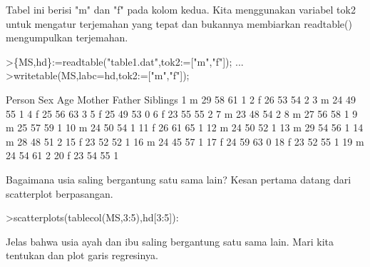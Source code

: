 \documentclass[12pt,arial,letterpaper]{book}
\begin{document}
\begin{eulernootebook}
\begin{eulercomment}
\begin{eulercomment}
\begin{eulernootebook}
\begin{eulercomment}
\begin{eulercomment}
\begin{eulercomment}
\begin{eulercomment}
\begin{eulercomment}
\begin{eulercomment}
\begin{eulercomment}
\begin{eulercomment}
Tabel ini berisi "m" dan "f" pada kolom kedua. Kita menggunakan
variabel tok2 untuk mengatur terjemahan yang tepat dan bukannya
membiarkan readtable() mengumpulkan terjemahan.
\end{eulercomment}
\begin{eulerprompt}
>\{MS,hd\}:=readtable("table1.dat",tok2:=["m","f"]);  ...
>writetable(MS,labc=hd,tok2:=["m","f"]);
\end{eulerprompt}
\begin{euleroutput}
      Person       Sex       Age    Mother    Father  Siblings
           1         m        29        58        61         1
           2         f        26        53        54         2
           3         m        24        49        55         1
           4         f        25        56        63         3
           5         f        25        49        53         0
           6         f        23        55        55         2
           7         m        23        48        54         2
           8         m        27        56        58         1
           9         m        25        57        59         1
          10         m        24        50        54         1
          11         f        26        61        65         1
          12         m        24        50        52         1
          13         m        29        54        56         1
          14         m        28        48        51         2
          15         f        23        52        52         1
          16         m        24        45        57         1
          17         f        24        59        63         0
          18         f        23        52        55         1
          19         m        24        54        61         2
          20         f        23        54        55         1
\end{euleroutput}
\begin{eulercomment}
Bagaimana usia saling bergantung satu sama lain? Kesan pertama datang
dari scatterplot berpasangan.
\end{eulercomment}
\begin{eulerprompt}
>scatterplots(tablecol(MS,3:5),hd[3:5]):
\end{eulerprompt}
\begin{eulercomment}
Jelas bahwa usia ayah dan ibu saling bergantung satu sama lain. Mari
kita tentukan dan plot garis regresinya.
\end{eulercomment}
\begin{eulerprompt}

\end{eulerprompt}
\end{eulercomment}
\end{eulercomment}
\end{eulercomment}
\end{eulercomment}
\end{eulercomment}
\end{eulercomment}
\end{eulercomment}
\end{eulernootebook}
\end{eulercomment}
\end{eulercomment}
\end{eulernootebook}
\end{document}
